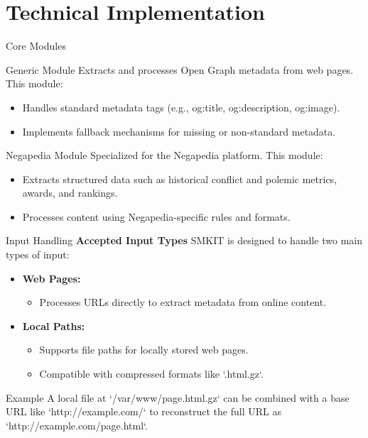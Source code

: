 \documentclass{beamer}
\begin{document}
\section{Technical Implementation}
    \begin{frame}{Core Modules}
        \begin{block}{Generic Module}
            Extracts and processes Open Graph metadata from web pages. This module:
            \begin{itemize}
                \item Handles standard metadata tags (e.g., og:title, og:description, og:image).
                \item Implements fallback mechanisms for missing or non-standard metadata.
            \end{itemize}
        \end{block}

        \begin{block}{Negapedia Module}
            Specialized for the Negapedia platform.
            This module:
            \begin{itemize}
                \item Extracts structured data such as historical conflict and polemic metrics, awards, and rankings.
                \item Processes content using Negapedia-specific rules and formats.
            \end{itemize}
        \end{block}
    \end{frame}

    \begin{frame}{Input Handling}
        \textbf{Accepted Input Types}
            SMKIT is designed to handle two main types of input:
            \begin{itemize}
                \item \textbf{Web Pages:}
                    \begin{itemize}
                        \item Processes URLs directly to extract metadata from online content.
                    \end{itemize}
                \item \textbf{Local Paths:}
                    \begin{itemize}
                        \item Supports file paths for locally stored web pages.
                        \item Compatible with compressed formats like `.html.gz`.
                    \end{itemize}
            \end{itemize}
        \begin{exampleblock}{Example}
            A local file at `/var/www/page.html.gz` can be combined with a base URL like `http://example.com/` to reconstruct the full URL as `http://example.com/page.html`.
        \end{exampleblock}            
    \end{frame}    
\end{document}
